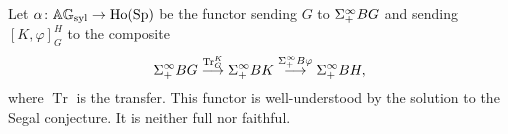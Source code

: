 \documentclass[10pt]{amsart}
\theoremstyle{definition}
\DeclareMathOperator{\Tr}{Tr}
\DeclareMathOperator{\Sp}{Sp}
\DeclareMathOperator{\Ho}{Ho}
\newtheorem{proposition}[theorem]{Proposition}
\newtheorem{remark}[theorem]{Remark}
\DeclareMathOperator{\id}{id}
\renewcommand{\phi}{\varphi}
\begin{document}
\begin{comment}
There is a close relationship between the category of saturated fusion systems $\F$ and the category of $p$-groups $\Po$.

First note that $\Po$ is a full subcategory of both $\G$ and $\Gs$. Let $F|_{\Po} \colon \Po \rightarrow \F$ be the restriction of $F \colon \Gs \rightarrow \F$ to $\Po$. This functor is fully faithful.

There is a forgetful functor $u \colon \F \rightarrow \Po$ given by sending a fusion preserving map $(\cF,S) \rightarrow (\cG,T)$ to the map of $p$-groups $S \rightarrow T$ and


The functor $\widehat{(-)}$ may be restricted to $\AP$. The resulting functor must factor through $\AP_p$ because the hom-sets in $\AF$ are $\Z_p$-modules. That is, there is a canonical factorization
\[
\xymatrix{\AP(S,T) \ar[rr] \ar[dr] & & \AF(\cF_S, \cF_T). \\ & \Z_p \otimes \AP(S,T) \ar[ur]_-{\cong}&}
\]
In fact, $\AP_p$ is a full subcategory of $\AF$. Let $i \colon \AP_p \hookrightarrow \AF$ be the inclusion. There is also a canonical faithful functor $\AF \rightarrow \AP_p$. For a stable $(\cF_1,\cF_2)$-set, it is given by forgetting the stable structure.


\begin{proposition} \label{retract}
The functor $\Po \rightarrow \AP_p$ is a retract of the functor $\F \rightarrow \AF$. That is, there is a commutative diagram
\[
\xymatrix{\Po \ar[r]_{F|_{\Po}} \ar@/^1pc/[rr]^{\id} \ar[d] & \F \ar[r] \ar[d] & \Po \ar[d] \\ \AP_p \ar[r]^{i} \ar@/_1pc/[rr]_{\id} & \AF  \ar[r] & \AP_p.}
\]
\end{proposition}
\end{comment}

\begin{comment}
\begin{remark}
The fully faithful functor $F|_{\Po} \colon \Po \rightarrow \F$ extends to a fully faithful functor from the category of finite groups with a unique Sylow subgroup. However, that category does not produce a retract as in Propostion \ref{retract}.
\end{remark}
\end{comment}

Let $\al \colon \AGs \rightarrow \Ho(\Sp)$ be the functor sending $G$ to $\Sigma^{\infty}_{+} BG$ and sending $[K, \phi]_{G}^{H}$ to the composite
\[
\Sinfp BG \lra{\Tr_{G}^{K}} \Sinfp BK \lra{\Sinfp B\phi} \Sinfp BH,
\]
where $\Tr$ is the transfer. This functor is well-understood by the solution to the Segal conjecture. It is neither full nor faithful.
\end{document}
